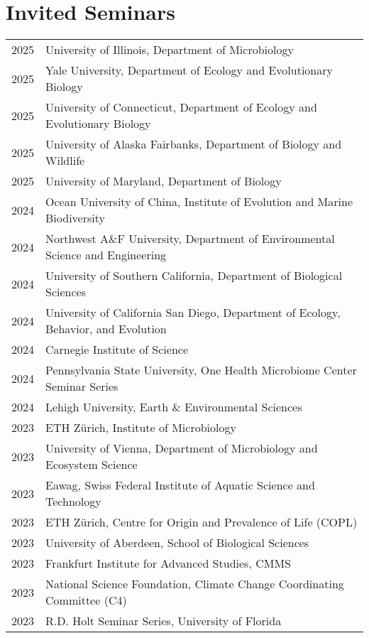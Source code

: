 \documentclass[11pt]{article}
\begin{document}
\section*{Invited Seminars}
\vspace{-1.25em} %
\noindent
\begin{longtable}{@{}p{3em}@{\hspace{1.5em}}p{}@{}}
2025 & University of Illinois, Department of Microbiology \\
2025 & Yale University, Department of Ecology and Evolutionary Biology \\
2025 & University of Connecticut, Department of Ecology and Evolutionary Biology \\
2025 & University of Alaska Fairbanks, Department of Biology and Wildlife \\
2025 & University of Maryland, Department of Biology \\
2024 & Ocean University of China, Institute of Evolution and Marine Biodiversity \\
2024 & Northwest A\&F University, Department of Environmental Science and Engineering \\
2024 & University of Southern California, Department of Biological Sciences \\
2024 & University of California San Diego, Department of Ecology, Behavior, and Evolution \\
2024 & Carnegie Institute of Science \\
2024 & Pennsylvania State University, One Health Microbiome Center Seminar Series \\
2024 & Lehigh University, Earth \& Environmental Sciences \\
2023 & ETH Zürich, Institute of Microbiology \\
2023 & University of Vienna, Department of Microbiology and Ecosystem Science \\
2023 & Eawag, Swiss Federal Institute of Aquatic Science and Technology \\
2023 & ETH Zürich, Centre for Origin and Prevalence of Life (COPL) \\
2023 & University of Aberdeen, School of Biological Sciences \\
2023 & Frankfurt Institute for Advanced Studies, CMMS \\
2023 & National Science Foundation, Climate Change Coordinating Committee (C4) \\
2023 & R.D. Holt Seminar Series, University of Florida \\

\end{longtable}
\end{document}
